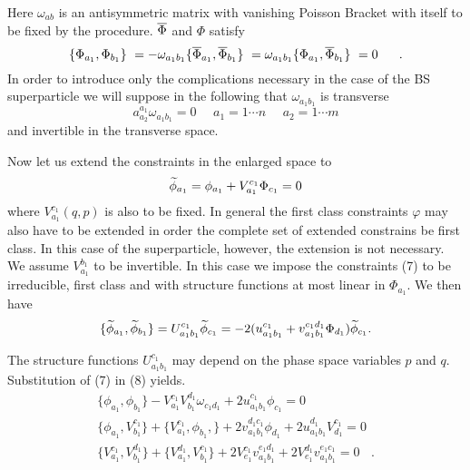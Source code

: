 \documentclass[a4paper,10pt]{article}
\begin{document}
Here $\omega_{ab}$ is an antisymmetric matrix with vanishing Poisson Bracket with
itself to be fixed by the procedure. $\overline{\Phi}$ and $\Phi$ satisfy
\begin{equation}
\label{5}
\{\Phi_{a_1},\Phi_{b_1}\}\ =-\omega_{a_1b_1}\\
\{\overline{\Phi}_{a_1},\overline{\Phi}_{b_1}\}\ =\omega_{a_1b_1}\\
\{\Phi_{a_1},\overline{\Phi}_{b_1}\}\ =0\ \ \ \ \ .
\end{equation}
In order to introduce only the complications necessary in  the case of
the BS superparticle we will suppose in the following that $\omega_{a_1b_1}$ is
transverse
\begin{equation}
\label{6}
a^{a_1}_{a_2}\omega_{a_1b_1}=0\ \ \ \ \ \ a_1=1\cdots n
\ \ \ \ \ \ a_2=1\cdots m
\end{equation}
and invertible in the transverse space.


Now let us extend the constraints in the enlarged space to
\begin{equation}
\label{7}
\widetilde{\phi}_{a_1}=\phi_{a_1}+V^{c_1}_{a_1}\Phi_{c_1}=0
\end{equation}
where  $V^{c_1}_{a_1}(q,p)$ is also to be fixed. In general the first class
constraints $\varphi$ may  also have to be extended in order the complete set
of extended constrains be first class. In this case of the superparticle,
however, the extension is not necessary. We assume $V_{a_1}^{b_1}$ to
be invertible. In this case we impose the constraints (7) to be irreducible,
first class and with structure functions at most linear in $\Phi_{a_1}$. We
then have
\begin{equation}
\label{8}
\{\widetilde{\phi}_{a_1},\widetilde{\phi}_{b_1}\}=U_{a_1b_1}^{c_1}\widetilde{\phi}_{c_1}
=-2(u_{a_1b_1}^{c_1}+v_{a_1b_1}^{c_1d_1} \Phi_{d_1})\widetilde{\phi}_{c_1} .
\end{equation}

The structure functions $U_{a_1b_1}^{c_1}$ may depend on the phase space
variables $p$ and $q$. Substitution of (7) in (8) yields.
\begin{eqnarray}
\label{9}
\{\phi_{a_1},\phi_{b_1}\} -V_{a_1}^{c_1}V_{b_1}^{d_1}\omega_{c_1d_1}+
2u_{a_1b_1}^{c_1}\phi_{c_1}=0  \nonumber \\
\{\phi_{a_1},V_{b_1}^{c_1}\}+\{V_{a_1}^{c_1},\phi_{b_1},\}
+2v_{a_1b_1}^{d_1c_1}\phi_{d_1}+ 2u_{a_1b_1}^{d_1}V_{d_1}^{c_1}=0 \\
\{V_{a_1}^{c_1},V_{b_1}^{d_1}\}+\{V_{a_1}^{d_1},V_{b_1}^{c_1}\}
+2V_{e_1}^{c_1}v_{a_1b_1}^{e_1d_1}+ 2V_{e_1}^{d_1}v_{a_1b_1}^{e_1c_1}=0\ \ \ \ . \nonumber
\end{eqnarray}
\end{document}
